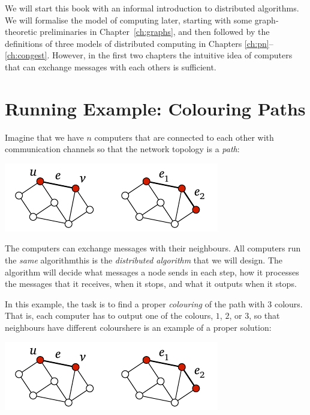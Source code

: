 
We will start this book with an informal introduction to distributed algorithms. We will formalise the model of computing later, starting with some graph-theoretic preliminaries in Chapter~\ref{ch:graphs}, and then followed by the definitions of three models of distributed computing in Chapters \ref{ch:pn}--\ref{ch:congest}. However, in the first two chapters the intuitive idea of computers that can exchange messages with each others is sufficient.

\section{Running Example: Colouring Paths}

Imagine that we have $n$ computers that are connected to each other with communication channels so that the network topology is a \emph{path}:
\begin{center}
    \includegraphics[page=\PIntroTopo]{figs.pdf}
\end{center}
The computers can exchange messages with their neighbours. All computers run the \emph{same} algorithm\mydash this is the \emph{distributed algorithm} that we will design. The algorithm will decide what messages a node sends in each step, how it processes the messages that it receives, when it stops, and what it outputs when it stops.

In this example, the task is to find a proper \emph{colouring} of the path with $3$ colours. That is, each computer has to output one of the colours, $1$, $2$, or $3$, so that neighbours have different colours\mydash here is an example of a proper solution:
\begin{center}
    \includegraphics[page=\PIntroCol]{figs.pdf}
\end{center}

